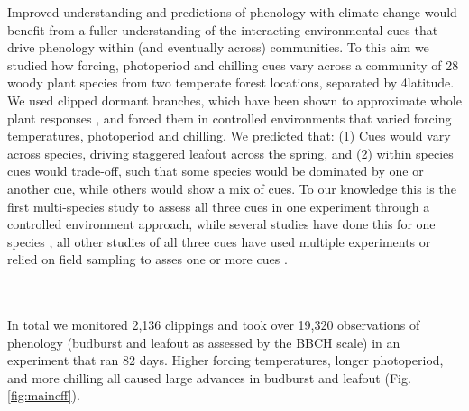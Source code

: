 \documentclass[11pt]{article}
\begin{document}
Improved understanding and predictions of phenology with climate change would benefit from a fuller understanding of the interacting environmental cues that drive phenology within (and eventually across) communities. To this aim we studied how forcing, photoperiod and chilling cues vary across a community of 28 woody plant species from two temperate forest locations, separated by 4\degree latitude. We used clipped dormant branches, which have been shown to approximate whole plant responses \citep{vitasseclippings}, and forced them in controlled environments that varied forcing temperatures, photoperiod and chilling. We predicted that: (1) Cues would vary across species, driving staggered leafout across the spring, and (2) within species cues would trade-off, such that some species would be dominated by one or another cue, while others would show a mix of cues. To our knowledge this is the first multi-species study to assess all three cues in one experiment through a controlled environment approach, while several studies have done this for one species \citep{Worrall:1967aa,Skuterud:1994aa,Sogaard:2008aa,Sonsteby:2014aa}, all other studies of all three cues have used multiple experiments \citep[e.g.,][]{Caffarra:2011ab} or relied on field sampling to asses one or more cues \citep[e.g,][]{Basler:2012aa,laube2014gcb,zohner2016ncc}. 

\vspace{2ex}\\
\vspace{2ex}\\
\noindent In total we monitored 2,136 clippings and took over 19,320 observations of phenology (budburst and leafout as assessed by the BBCH scale) in an experiment that ran 82 days. Higher forcing temperatures, longer photoperiod, and more chilling all caused large advances in budburst and leafout (Fig. \ref{fig:maineff}).
\end{document}
